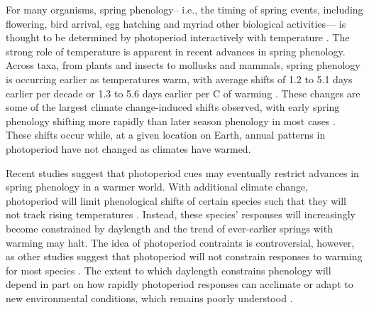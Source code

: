 \documentclass{article}
\begin{document}
\par For many organisms, spring phenology-- i.e., the timing of spring events, including flowering, bird arrival, egg hatching and myriad other biological activities--- is thought to be determined by photoperiod interactively with temperature \citep[][see also Box 1]{fu2019,winkler2014}. The strong role of temperature is apparent in recent advances in spring phenology. Across taxa, from plants and insects to mollusks and mammals, spring phenology is occurring earlier as temperatures warm, with average shifts of 1.2 to 5.1 days earlier per decade \citep{bradley1999,parmesan2003, poloczanska2013,root2003} or 1.3 to 5.6 days earlier per \degree C of warming \citep{polgar2013,Wolkovich:2012n}. These changes are some of the largest climate change-induced shifts observed, with early spring phenology shifting more rapidly than later season phenology in most cases \citep{bradley1999,menzel2006}. These shifts occur while, at a given location on Earth, annual patterns in photoperiod have not changed as climates have warmed. %
\par Recent studies suggest that photoperiod cues may eventually restrict advances in spring phenology in a warmer world. With additional climate change, photoperiod will limit phenological shifts of certain species such that they will not track rising temperatures \citep{fu2015,way2015,Basler:2012,koerner2010a}. Instead, these species' responses will increasingly become constrained by daylength and the trend of ever-earlier springs with warming may halt. The idea of photoperiod contraints is controversial, however, as other studies suggest that photoperiod will not constrain responses to warming for most species \citep{chuine2010,zohner2016}. The extent to which daylength constrains phenology will depend in part on how rapidly photoperiod responses can acclimate or adapt to new environmental conditions, which remains poorly understood \citep{grevstad2015,bradshaw2007}.
\end{document}

